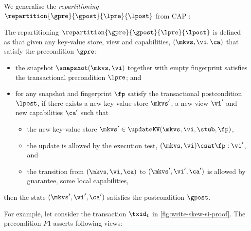 We generalise the \emph{repartitioning} \( \repartition{\gpre}{\gpost}{\lpre}{\lpost} \) from CAP \cite{cap}:
\begin{definition}[Repartitioning]
The repartitioning  \( \repartition{\gpre}{\gpost}{\lpre}{\lpost} \) is defined as that 
given any key-value store, view and capabilities, \( (\mkvs, \vi, \ca) \) that satisfy the precondition \( \gpre \):
\begin{itemize}
    \item the snapshot \( \snapshot(\mkvs,\vi) \) together with empty fingerprint satisfies the transactional precondition \( \lpre \); and
    \item for any snapshot and fingerprint \( \fp \) satisfy the transactional postcondition \( \lpost \), if
        there exists a new key-value store \( \mkvs' \), a new view \( \vi' \) and new capabilities \( \ca' \) such that 
    \begin{itemize}
        \item the new key-value store \( \mkvs' \in \updateKV(\mkvs, \vi, \stub, \fp) \),
        \item the update is allowed by the execution test, \ie \( (\mkvs, \vi) \csat \fp : \vi' \), and
        \item the transition from \( (\mkvs, \vi, \ca) \) to \( (\mkvs', \vi', \ca') \) is allowed by guarantee, \ie some local capabilities,
    \end{itemize} 
\end{itemize}
then the state \( (\mkvs', \vi', \ca') \) satisfies the postcondition \( \gpost \).
\end{definition}

For example,  let consider the transaction \( \txid_1 \) in \cref{fig:write-skew-si-proof}.
The precondition \( P1 \) asserts following views:

